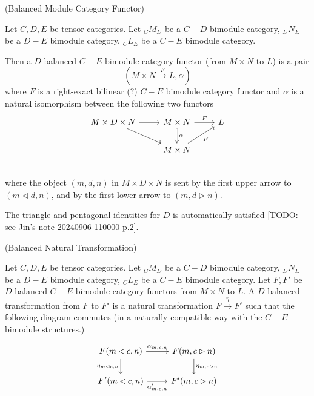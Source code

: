 \begin{definition} (Balanced Module Category Functor)

  \noindent Let $C, D, E$ be tensor categories. Let $_{C}M_{D}$ be a $C-D$
  bimodule category, $_{D}N_{E}$ be a $D-E$ bimodule category, $_{C}L_{E}$ be a $C-E$ bimodule category.

  \noindent Then a $D$-balanced $C-E$ bimodule category functor (from $M \times N$ to $L$) is a pair
  \[(M \times N \xrightarrow{F} L, \alpha)\]
  where $F$ is a right-exact bilinear (?) $C-E$ bimodule category functor and $\alpha$ is a natural isomorphism between the following two functors
  \[
    \begin{tikzcd}
      M \times D \times N \arrow[r] \arrow[dr] &
      M \times N \arrow[d, Rightarrow, "\alpha"] \arrow[r, "F"] &
      L \\
      & M \times N \arrow[ur, "F"'] \\
    \end{tikzcd}
  \]
  where the object $(m,d,n)$ in $M \times D \times N$ is sent by the first
  upper arrow to $(m \lhd d, n)$, and by the first lower arrow to $(m, d \rhd n)$.
\end{definition}

\begin{remark}
  The triangle and pentagonal identities for $D$ is automatically satisfied
  [TODO: see Jin's note 20240906-110000 p.2].
\end{remark}

\begin{definition} (Balanced Natural Transformation)

  \noindent Let $C, D, E$ be tensor categories. Let $_{C}M_{D}$ be a $C-D$
  bimodule category, $_{D}N_{E}$ be a $D-E$ bimodule category, $_{C}L_{E}$ be
  a $C-E$ bimodule category. Let $F, F'$ be $D$-balanced $C-E$ bimodule
  category functors from $M \times N$ to $L$. A $D$-balanced transformation
  from $F$ to $F'$ is a natural transformation $ F \xrightarrow{\eta} F'$ such
  that the following diagram commutes (in a naturally compatible way with the
  $C-E$ bimodule structures.)

  \[
    \begin{tikzcd}
      F(m \lhd c, n) \arrow[r, "\alpha_{m,c,n}"] \arrow[d, "\eta_{m \lhd c, n}"'] &
      F(m, c \rhd n) \arrow[d, "\eta_{m, c \rhd n}"] \\
      F'(m \lhd c, n) \arrow[r, "\alpha_{m,c,n}'"'] &
      F'(m, c \rhd n)
    \end{tikzcd}
  \]
\end{definition}

